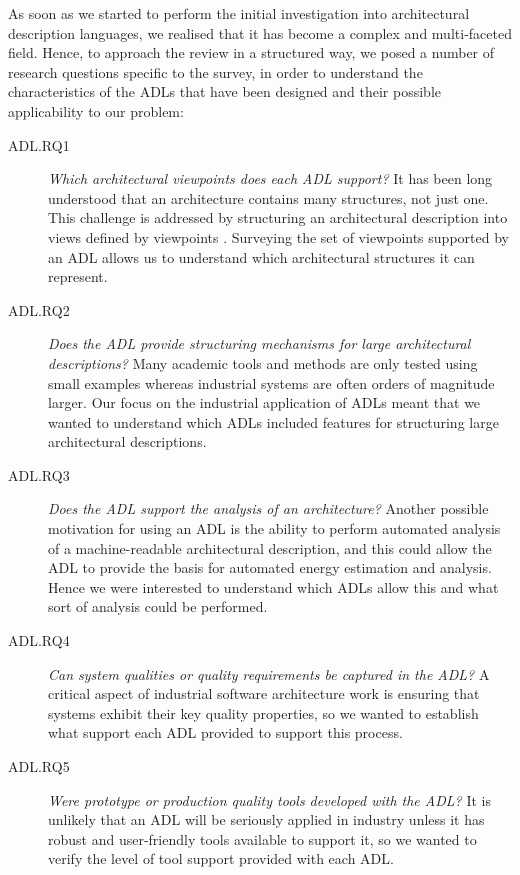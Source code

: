 As soon as we started to perform the initial investigation into architectural description languages, we realised that it has become a complex and multi-faceted field.  Hence, to approach the review in a structured way, we posed a number of research questions specific to the survey, in order to understand the characteristics of the ADLs that have been designed and their possible applicability to our problem:

\begin{description}
\item[ADL.RQ1] \emph{Which architectural viewpoints does each ADL support?}  It has been long understood that an architecture contains many structures, not just one.  This challenge is addressed by structuring an architectural description into views defined by viewpoints \cite{iso-42010}. Surveying the set of viewpoints supported by an ADL allows us to understand which architectural structures it can represent.

\item[ADL.RQ2] \emph{Does the ADL provide structuring mechanisms for large architectural descriptions?}  Many academic tools and methods are only tested using small examples whereas industrial systems are often orders of magnitude larger.  Our focus on the industrial application of ADLs meant that we wanted to understand which ADLs included features for structuring large architectural descriptions.

\item[ADL.RQ3] \emph{Does the ADL support the analysis of an architecture?}  Another possible motivation for using an ADL is the ability to perform automated analysis of a machine-readable architectural description, and this could allow the ADL to provide the basis for automated energy estimation and analysis. Hence we were interested to understand which ADLs allow this and what sort of analysis could be performed.

\item[ADL.RQ4] \emph{Can system qualities or quality requirements be captured in the ADL?}  A critical aspect of industrial software architecture work is ensuring that systems exhibit their key quality properties, so we wanted to establish what support each ADL provided to support this process.

\item[ADL.RQ5] \emph{Were prototype or production quality tools developed with the ADL?}  It is unlikely that an ADL will be seriously applied in industry unless it has robust and user-friendly tools available to support it, so we wanted to verify the level of tool support provided with each ADL.


\end{description}
